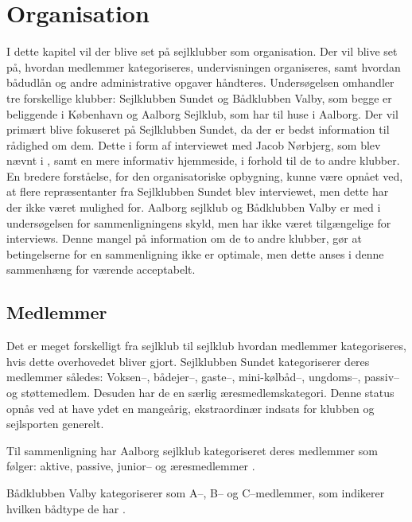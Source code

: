 \chapter{Organisation}\label{chap:organisation}

I dette kapitel vil der blive set på sejlklubber som organisation. 
Der vil blive set på, hvordan medlemmer kategoriseres, undervisningen organiseres, samt hvordan bådudlån og andre administrative opgaver håndteres. 
Undersøgelsen omhandler tre forskellige klubber: Sejlklubben Sundet og Bådklubben Valby, som begge er beliggende i København og Aalborg Sejlklub, som har til huse i Aalborg. 
Der vil primært blive fokuseret på Sejlklubben Sundet, da der er bedst information til rådighed om dem. 
Dette i form af interviewet med Jacob Nørbjerg, som blev nævnt i , samt en mere informativ hjemmeside, i forhold til de to andre klubber. 
En bredere forståelse, for den organisatoriske opbygning, kunne være opnået ved, at flere repræsentanter fra Sejlklubben Sundet blev interviewet, men dette har der ikke været mulighed for.
Aalborg sejlklub og Bådklubben Valby er med i undersøgelsen for sammenligningens skyld, men har ikke været tilgængelige for interviews. 
Denne mangel på information om de to andre klubber, gør at betingelserne for en sammenligning ikke er optimale, men dette anses i denne sammenhæng for værende acceptabelt.

\section{Medlemmer}\label{sec:organisation-medlemmer}

Det er meget forskelligt fra sejlklub til sejlklub hvordan medlemmer kategoriseres, hvis dette overhovedet bliver gjort.
Sejlklubben Sundet kategoriserer deres medlemmer således: Voksen--, bådejer--, gaste--, mini-kølbåd--,
ungdoms--, passiv-- og støttemedlem. 
Desuden har de en særlig æresmedlemskategori. Denne status opnås ved at have ydet en mangeårig, ekstraordinær indsats for klubben og sejlsporten generelt.\citep{sundet_vedtaegter}

Til sammenligning har Aalborg sejlklub kategoriseret deres medlemmer som følger: aktive, passive, junior-- og
æresmedlemmer \citep{aalborg_sejlklub_vedtaegter}.

Bådklubben Valby kategoriserer som A--, B-- og C--medlemmer, som indikerer hvilken bådtype de har
\citep{badklubben_valby_love}.

